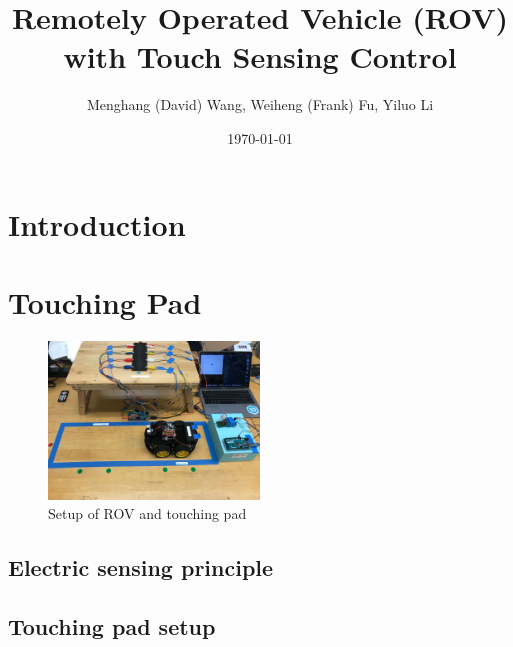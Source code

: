 \documentclass[reprint,amsmath, amsfonts, amssymb, aps, letterpaper]{revtex4-1}
\begin{document}
\title{Remotely Operated Vehicle (ROV) with Touch Sensing Control}
\author{Menghang (David) Wang, Weiheng (Frank) Fu, Yiluo Li}

\date{\today}



\begin{abstract}

\end{abstract}

\maketitle

\section{Introduction}

\section{Touching Pad}
\begin{figure}[h]
\centering
    \includegraphics[width=0.5\textwidth]{./figure/setup}     
       \caption{Setup of ROV and touching pad }
    \label{fig::reflect}
\end{figure}
\subsection{Electric sensing principle}
\subsection{Touching pad setup}
\end{document}
